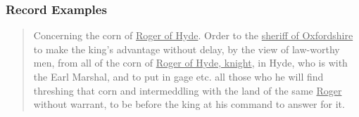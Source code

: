 \documentclass[12pt]{beamer}
\theoremstyle{break}
\begin{document}
\begin{frame}
	\frametitle{Record Examples}
	
	\begin{quote}
		\footnotesize
		Concerning the corn of \underline{Roger of Hyde}. Order to the \underline{sheriff of Oxfordshire} to make the king’s advantage without delay, by the view of law-worthy men, from all of the corn of \underline{Roger of Hyde, knight}, in Hyde, who is with the Earl Marshal, and to put in gage etc. all those who he will find threshing that corn and intermeddling with the land of the same \underline{Roger} without warrant, to be before the king at his command to answer for it.
	\end{quote}
	
	\begin{table}
		\footnotesize
		\centering
		
	\end{table}
	
\end{frame}














\end{document}
